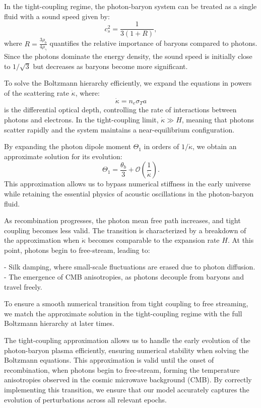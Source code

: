 \documentclass{aa}
\begin{document}
In the tight-coupling regime, the photon-baryon system can be treated as a single fluid with a sound speed given by:
\begin{equation}
c_s^2 = \frac{1}{3(1 + R)},
\end{equation}
where $R = \frac{3\rho_b}{4\rho_\gamma}$ quantifies the relative importance of baryons compared to photons. Since the photons dominate the energy density, the sound speed is initially close to $1/\sqrt{3}$ but decreases as baryons become more significant.

To solve the Boltzmann hierarchy efficiently, we expand the equations in powers of the scattering rate $\dot{\kappa}$, where:
\begin{equation}
\dot{\kappa} = n_e \sigma_T a
\end{equation}
is the differential optical depth, controlling the rate of interactions between photons and electrons. In the tight-coupling limit, $\dot{\kappa} \gg H$, meaning that photons scatter rapidly and the system maintains a near-equilibrium configuration.

By expanding the photon dipole moment $\Theta_1$ in orders of $1/\dot{\kappa}$, we obtain an approximate solution for its evolution:
\begin{equation}
\Theta_1 = \frac{\theta_b}{3} + \mathcal{O}\left(\frac{1}{\dot{\kappa}}\right).
\end{equation}
This approximation allows us to bypass numerical stiffness in the early universe while retaining the essential physics of acoustic oscillations in the photon-baryon fluid.

As recombination progresses, the photon mean free path increases, and tight coupling becomes less valid. The transition is characterized by a breakdown of the approximation when $\dot{\kappa}$ becomes comparable to the expansion rate $H$. At this point, photons begin to free-stream, leading to:

- Silk damping, where small-scale fluctuations are erased due to photon diffusion.
- The emergence of CMB anisotropies, as photons decouple from baryons and travel freely.

To ensure a smooth numerical transition from tight coupling to free streaming, we match the approximate solution in the tight-coupling regime with the full Boltzmann hierarchy at later times.

The tight-coupling approximation allows us to handle the early evolution of the photon-baryon plasma efficiently, ensuring numerical stability when solving the Boltzmann equations. This approximation is valid until the onset of recombination, when photons begin to free-stream, forming the temperature anisotropies observed in the cosmic microwave background (CMB). By correctly implementing this transition, we ensure that our model accurately captures the evolution of perturbations across all relevant epochs.
\color{black}
\end{document}

